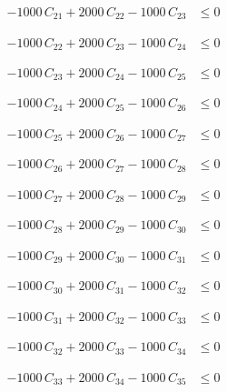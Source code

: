 \documentclass[a4paper,11pt]{article}
\begin{document}
\begin{align}
-1000\,C_{21} + 2000\,C_{22} - 1000\,C_{23} &\leq 0 \nonumber
\end{align}

\begin{align}
-1000\,C_{22} + 2000\,C_{23} - 1000\,C_{24} &\leq 0 \nonumber
\end{align}

\begin{align}
-1000\,C_{23} + 2000\,C_{24} - 1000\,C_{25} &\leq 0 \nonumber
\end{align}

\begin{align}
-1000\,C_{24} + 2000\,C_{25} - 1000\,C_{26} &\leq 0 \nonumber
\end{align}

\begin{align}
-1000\,C_{25} + 2000\,C_{26} - 1000\,C_{27} &\leq 0 \nonumber
\end{align}

\begin{align}
-1000\,C_{26} + 2000\,C_{27} - 1000\,C_{28} &\leq 0 \nonumber
\end{align}

\begin{align}
-1000\,C_{27} + 2000\,C_{28} - 1000\,C_{29} &\leq 0 \nonumber
\end{align}

\begin{align}
-1000\,C_{28} + 2000\,C_{29} - 1000\,C_{30} &\leq 0 \nonumber
\end{align}

\begin{align}
-1000\,C_{29} + 2000\,C_{30} - 1000\,C_{31} &\leq 0 \nonumber
\end{align}

\begin{align}
-1000\,C_{30} + 2000\,C_{31} - 1000\,C_{32} &\leq 0 \nonumber
\end{align}

\begin{align}
-1000\,C_{31} + 2000\,C_{32} - 1000\,C_{33} &\leq 0 \nonumber
\end{align}

\begin{align}
-1000\,C_{32} + 2000\,C_{33} - 1000\,C_{34} &\leq 0 \nonumber
\end{align}

\begin{align}
-1000\,C_{33} + 2000\,C_{34} - 1000\,C_{35} &\leq 0 \nonumber
\end{align}
\end{document}
